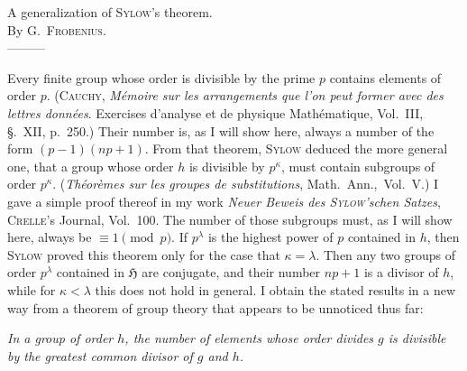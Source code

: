\documentclass[a5paper,12pt]{article}
\newcommand{\secformat}[1]{\centering{\normalfont\normalsize{#1}}}
\let\fr\mathfrak
\newcommand{\CH}{\fr{H}}
\newcommand{\?}{{\color{blue}${}^{(?)}$}}
\newcounter{origpagecounter}{}
\newcommand{\origpagefirst}[1]{\smash{\setcounter{origpagecounter}{#1}\mark{\arabic{origpagecounter}}}}
\begin{document}

\thispagestyle{empty}
\origpagefirst{981}

\begin{center}
	{\Large
		{A generalization of \textsc{Sylow}'s theorem.}
		\\
	}
	{\large
		{By \textsc{G.~Frobenius}.}
		\\
		---------
	}
\end{center}



\noindent
%
Every finite group whose order
is divisible by the prime $p$
contains elements of order $p$.
%
%
(\textsc{Cauchy},
\emph{M\'emoire sur les arrangements que l'on peut former avec des lettres donn\'ees}.
Exercises d'analyse et de physique Math\'ematique,
Vol.~III,
\S.~XII,
p.~250.)
%
%
Their number is,
as I will show here,
always a number of the form
$(p - 1) (n p + 1)$.
%
%
From that theorem,
\textsc{Sylow} deduced the more general one,
that a group
whose order $h$ is divisible by $p^\kappa$,
must contain subgroups of order $p^\kappa$.
%
%
(\emph{Th\'eor\`emes sur les groupes de substitutions},
Math.~Ann.,~Vol.~V.)
%
%
I gave a simple proof thereof
in my work
\emph{Neuer Beweis des \textsc{Sylow}'schen Satzes},
\textsc{Crelle}'s Journal,
Vol.~100.
%
%
The number of those subgroups must,
as I will show here,
always be $\equiv 1 \pmod{p}$.
%
%
If $p^\lambda$ is the highest power of $p$
contained in $h$,
then \textsc{Sylow} proved this theorem
only for the case that $\kappa = \lambda$.
%
%
Then any two groups of order $p^\lambda$
contained in $\CH$
are conjugate,
and their number $n p + 1$
is a divisor of $h$,
while for $\kappa < \lambda$
this does not hold in general.
%
%
I obtain the stated results
in a new way
from a theorem of group theory
that appears to be unnoticed thus far:


\emph{ %
In a group of order $h$,
the number of elements
whose order divides $g$
is divisible by
the greatest common divisor
of $g$ and $h$.
}



\subsubsection*{\secformat{\S.~1.}}
\end{document}
